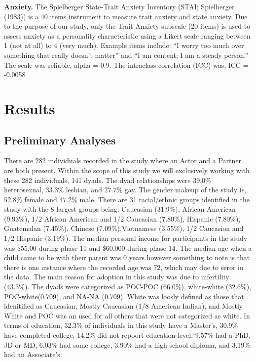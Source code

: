 \documentclass[man]{apa6}
\begin{document}
\textbf{Anxiety.}
The Spielberger State-Trait Anxiety Inventory (STAI; Spielberger (1983)) is a 40 items instrument to measure trait anxiety and state anxiety. Due to the purpose of our study, only the Trait Anxiety subscale (20 items) is used to assess anxiety as a personality characteristic using a Likert scale ranging between 1 (not at all) to 4 (very much). Example items include: \enquote{I worry too much over something that really doesn't matter} and \enquote{I am content; I am a steady person.} The scale was reliable, alpha = 0.9. The intraclass correlation (ICC) was, ICC = -0.0058

\hypertarget{results}{%
\section{Results}\label{results}}

\hypertarget{preliminary-analyses}{%
\subsection{Preliminary Analyses}\label{preliminary-analyses}}

There are 282 individuals recorded in the study where an Actor and a Partner are both present. Within the scope of this study we will exclusively working with these 282 individuals, 141 dyads.
The dyad relationships were 39.0\% heterosexual, 33.3\% lesbian, and 27.7\% gay.
The gender makeup of the study is, 52.8\% female and 47.2\% male.
There are 31 racial/ethnic groups identified in the study with the 8 largest groups being: Caucasian (31.9\%), African American (9.93\%), 1/2 African American and 1/2 Caucasian (7.80\%), Hispanic (7.80\%), Guatemalan (7.45\%), Chinese (7.09\%),Vietnamese (3.55\%), 1/2 Caucasion and 1/2 Hispanic (3.19\%).
The median personal income for participants in the study was \$55,00 during phase 11 and \$60,000 during phase 14.
The median age when a child came to be with their parent was 0 years however something to note is that there is one instance where the recorded age was 72, which may due to error in the data.
The main reason for adoption in this study was due to infertility (43.3\%).
The dyads were categorized as POC-POC (66.0\%), white-white (32.6\%), POC-white(0.709), and NA-NA (0.709). White was loosly defined as those that idenitified as Caucasian, Mostly Caucasian (1/8 American Indian), and Mostly White and POC was an used for all others that were not categorized as white.
In terms of education, 32.3\% of individuals in this study have a Master's, 30.9\% have completed college, 14.2\% did not repoort education level, 9.57\% had a PhD, JD or MD, 6.03\% had some college, 3.90\% had a high school diploma, and 3.19\% had an Associate's.
\end{document}
